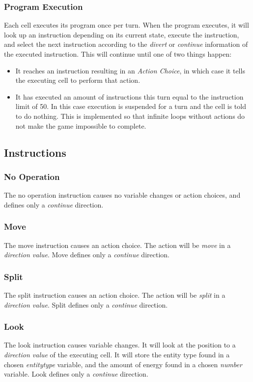 \subsubsection{Program Execution}

Each cell executes its program once per turn. When the program executes, it will look up an instruction depending on its current state, execute the instruction, and select the next instruction according to the \emph{divert} or \emph{continue} information of the executed instruction. This will continue until one of two things happen:
\begin{itemize}
\item It reaches an instruction resulting in an \emph{Action Choice}, in which case it tells the executing cell to perform that action.
\item It has executed an amount of instructions this turn equal to the instruction limit of 50. In this case execution is suspended for a turn and the cell is told to do nothing. This is implemented so that infinite loops without actions do not make the game impossible to complete.
\end{itemize}

\subsection{Instructions}
\label{sub:instructions}

\subsubsection{No Operation}
The no operation instruction causes no variable changes or action choices, and defines only a \emph{continue} direction.

\subsubsection{Move}
The move instruction causes an action choice. The action will be \emph{move} in a \emph{direction value}. Move defines only a \emph{continue} direction.

\subsubsection{Split}
The split instruction causes an action choice. The action will be \emph{split} in a \emph{direction value}. Split defines only a \emph{continue} direction.

\subsubsection{Look}
The look instruction causes variable changes. It will look at the position to a \emph{direction value} of the executing cell. It will store the entity type found in a chosen \emph{entitytype} variable, and the amount of energy found in a chosen \emph{number} variable. Look defines only a \emph{continue} direction.

